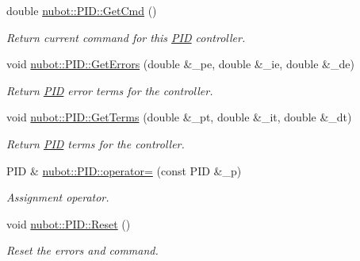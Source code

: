 \begin{DoxyCompactItemize}
double \hyperlink{group__gazebo__common_gafcc5fde219a034baee2be82906c17996}{nubot\-::\-P\-I\-D\-::\-Get\-Cmd} ()
\begin{DoxyCompactList}\small\item\em Return current command for this \hyperlink{classnubot_1_1PID}{P\-I\-D} controller. \end{DoxyCompactList}\item 
void \hyperlink{group__gazebo__common_ga23f7bafbad7472d8d8dce24236bf5baa}{nubot\-::\-P\-I\-D\-::\-Get\-Errors} (double \&\-\_\-pe, double \&\-\_\-ie, double \&\-\_\-de)
\begin{DoxyCompactList}\small\item\em Return \hyperlink{classnubot_1_1PID}{P\-I\-D} error terms for the controller. \end{DoxyCompactList}\item 
void \hyperlink{group__gazebo__common_ga012fe343ac6256b82f97f6e0ce2710f7}{nubot\-::\-P\-I\-D\-::\-Get\-Terms} (double \&\-\_\-pt, double \&\-\_\-it, double \&\-\_\-dt)
\begin{DoxyCompactList}\small\item\em Return \hyperlink{classnubot_1_1PID}{P\-I\-D} terms for the controller. \end{DoxyCompactList}\item 
P\-I\-D \& \hyperlink{group__gazebo__common_gadd67e35a4895870bb49e62479232cf2f}{nubot\-::\-P\-I\-D\-::operator=} (const P\-I\-D \&\-\_\-p)
\begin{DoxyCompactList}\small\item\em Assignment operator. \end{DoxyCompactList}\item 
void \hyperlink{group__gazebo__common_ga9f949fd4445477ee9bf1af2bfa3e1a84}{nubot\-::\-P\-I\-D\-::\-Reset} ()
\begin{DoxyCompactList}\small\item\em Reset the errors and command. \end{DoxyCompactList}\end{DoxyCompactItemize}
